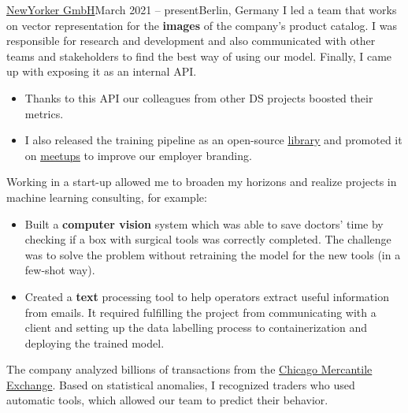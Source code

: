 
{\href{https://www.newyorker.de/}{NewYorker GmbH}}{March 2021 -- present}{Berlin, Germany}
I led a team that works on vector representation for the \textbf{images} of the company's product catalog.
I was responsible for research and development and also
communicated with other teams and stakeholders to find the best way of using our model.
Finally, I came up with exposing it as an internal API. 
\begin{itemize}
\item Thanks to this API our colleagues from other DS projects boosted their metrics. 
\item I also released the training pipeline as an open-source \href{https://github.com/OML-Team/open-metric-learning}{\underline{library}} and promoted
it on 
\href{https://drive.google.com/drive/folders/1uHmLU8vMrMVMFodt36u0uXAgYjG_3D30?usp=share_link}{\underline{meetups}}
to improve our employer branding. 
\end{itemize}

\divider

Working in a start-up allowed me to broaden my horizons and realize projects in machine learning consulting, for example:
\begin{itemize}
\item Built a \textbf{computer vision} system which was able to save doctors' time by checking if a box with surgical tools was correctly completed. The challenge was to solve the problem without retraining the model for the new tools (in a few-shot way).
\item Created a \textbf{text} processing tool to help operators extract useful information from emails. It required fulfilling the project from communicating with a client and setting up the data labelling process to containerization and deploying the trained model.
\end{itemize}

\divider

The company analyzed billions of transactions from the \href{https://en.wikipedia.org/wiki/Chicago_Mercantile_Exchange}
{Chicago Mercantile Exchange}.
Based on statistical anomalies, I recognized traders who used automatic tools, which allowed our team to predict their behavior.
\smallskip
\smallskip
